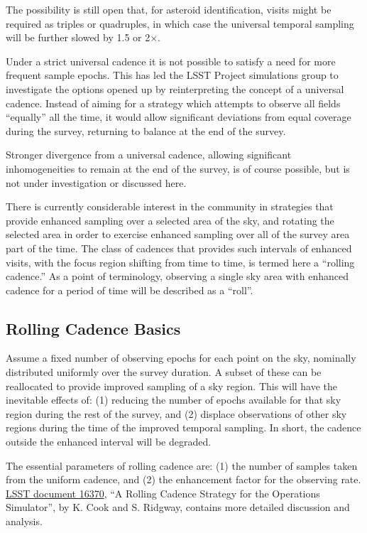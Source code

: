 The possibility is still open that, for asteroid identification, visits
might be required as triples or quadruples, in which case the universal
temporal sampling will be further slowed by 1.5 or 2$\times$.

Under a strict universal cadence it is not possible to satisfy a need
for more frequent sample epochs.  This has led the LSST Project
simulations group to investigate the options opened up by reinterpreting
the concept of a universal cadence.  Instead of aiming for a strategy
which attempts to observe all fields ``equally'' all the time, it would
allow significant deviations from equal coverage during the survey,
returning to balance at the end of the survey.

Stronger divergence from a universal cadence, allowing significant
inhomogeneities to remain at the end of the survey, is of course
possible, but is not under investigation or discussed here.

There is currently considerable interest in the community in strategies
that provide enhanced sampling over a selected area of the sky, and
rotating the selected area in order to exercise enhanced sampling over
all of the survey area part of the time.  The class of cadences that
provides such intervals of enhanced visits, with the focus region
shifting from time to time, is termed here a ``rolling cadence.''  As a
point of terminology, observing a single sky area with enhanced cadence
for a period of time will be described as a ``roll''.


\subsection{Rolling Cadence Basics}

Assume a fixed number of observing epochs for each point on the sky,
nominally distributed uniformly over the survey duration.  A subset of
these can be reallocated to provide improved sampling of a sky region.
This will have the inevitable effects of: (1) reducing the number of
epochs available for that sky region during the rest of the survey, and
(2) displace observations of other sky regions during the time of the
improved temporal sampling.  In short, the cadence outside the enhanced
interval will be degraded.

The essential parameters of rolling cadence are: (1) the number of
samples taken from the uniform cadence, and (2) the enhancement factor
for the observing rate.
\href{https://project.lsst.org/meetings/ocw/sites/lsst.org.meetings.ocw/files/OpSim%20Rolling%20Cadence%20Stratgey-ver1.3.pdf}{LSST document 16370},
``A Rolling Cadence Strategy for the Operations Simulator'', by K. Cook
and S. Ridgway, contains more detailed discussion and analysis.


